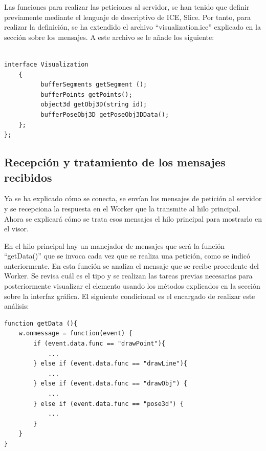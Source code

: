 Las funciones para realizar las peticiones al servidor, se han tenido que definir previamente mediante el lenguaje de descriptivo de ICE, Slice. Por tanto, para realizar la definición, se ha extendido el archivo ``visualization.ice'' explicado en la sección sobre los mensajes. A este archivo se le añade los siguiente:

\begin{lstlisting}[frame=single]

interface Visualization
	{
	      bufferSegments getSegment ();
	      bufferPoints getPoints();
	      object3d getObj3D(string id);
	      bufferPoseObj3D getPoseObj3DData();
	};
};

\end{lstlisting}

\subsection{Recepción y tratamiento de los mensajes recibidos}
Ya se ha explicado cómo se conecta, se envían los mensajes de petición al servidor y se recepciona la respuesta en el Worker que la transmite al hilo principal. Ahora se explicará cómo se trata esos mensajes el hilo principal para mostrarlo en el visor.

En el hilo principal hay un manejador de mensajes que será la función ``getData()'' que se invoca cada vez que se realiza una petición, como se indicó anteriormente. En esta función se analiza el mensaje que se recibe procedente del Worker. Se revisa cuál es el tipo y se realizan las tareas previas necesarias para posteriormente visualizar el elemento usando los métodos explicados en la sección sobre la interfaz gráfica. El siguiente condicional es el encargado de realizar este análisis:

\begin{lstlisting}[frame=single]
function getData (){
	w.onmessage = function(event) {
		if (event.data.func == "drawPoint"){
			...
		} else if (event.data.func == "drawLine"){
			...
		} else if (event.data.func == "drawObj") {
			...
		} else if (event.data.func == "pose3d") {
			...
		}
	}
}
\end{lstlisting}

